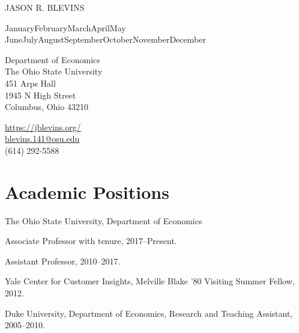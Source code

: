 \documentclass[10pt,letterpaper]{article}
\def\name{Jason R. Blevins}
\newcommand{\titlefont}[1]{{\titleface\large\MakeUppercase{#1}}}
\renewenvironment{itemize}{
  \begin{list}{}{
      \setlength{\leftmargin}{1.5em}
      \setlength{\itemsep}{0.25em}
      \setlength{\parskip}{0pt}
      \setlength{\parsep}{0.25em}
    }
}{
  \end{list}
}
\renewcommand{\today}{\ifcase \month \or January\or February\or March\or April\or May%
\or June\or July\or August\or September\or October\or November\or December\fi%
\space \number \year}
\begin{document}
\titlefont{\name}


\bigskip
\today

\bigskip
\begin{minipage}[t]{0.495\textwidth}
  Department of Economics \\
  The Ohio State University \\
  451 Arps Hall \\
  1945 N High Street \\
  Columbus, Ohio 43210
\end{minipage}
\begin{minipage}[t]{0.495\textwidth}
  \href{https://jblevins.org/}{https://jblevins.org/} \\
  \href{mailto:blevins.141@osu.edu}{blevins.141@osu.edu} \\
  (614) 292-5588
\end{minipage}

\section*{Academic Positions}

\begin{itemize}
\item The Ohio State University, Department of Economics
  \begin{itemize}
  \item Associate Professor with tenure, 2017--Present.
  \item Assistant Professor, 2010--2017.
  \end{itemize}
\item Yale Center for Customer Insights,
  Melville Blake '80 Visiting Summer Fellow,
  2012.
\item Duke University, Department of Economics,
  Research and Teaching Assistant,
  2005--2010.
\end{itemize}
\end{document}
